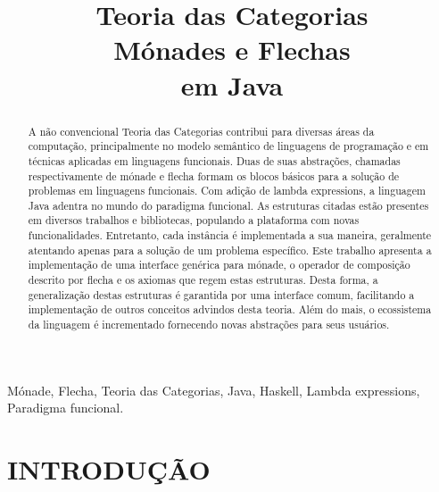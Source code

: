 \documentclass[10pt, conference]{IEEEtran}
\begin{document}

\title { 
	Teoria das Categorias \\
	Mónades e Flechas \\
	em Java 
}

\author{

}
					  
\maketitle

\begin{abstract}
A não convencional Teoria das Categorias contribui para diversas áreas da computação, principalmente no modelo semântico de linguagens de programação e em técnicas aplicadas em linguagens funcionais. Duas de suas abstrações, chamadas respectivamente de mónade e flecha formam os blocos básicos para a solução de problemas em linguagens funcionais. Com adição de lambda expressions, a linguagem Java adentra no mundo do paradigma funcional. As estruturas citadas estão presentes em diversos trabalhos e bibliotecas, populando a plataforma com novas funcionalidades. Entretanto, cada instância é implementada a sua maneira, geralmente atentando apenas para a solução de um problema específico. Este trabalho apresenta a implementação de uma interface genérica para mónade, o operador de composição descrito por flecha e os axiomas que regem estas estruturas. Desta forma, a generalização destas estruturas é garantida por uma interface comum, facilitando a implementação de outros conceitos advindos desta teoria. Além do mais, o ecossistema da linguagem é incrementado fornecendo novas abstrações para seus usuários.\\
\end{abstract}

\begin{IEEEkeywords}
Mónade, Flecha, Teoria das Categorias, Java, Haskell, Lambda expressions, Paradigma funcional.
\end{IEEEkeywords}

\section{INTRODUÇÃO}
\label{sec:intro}
\end{document}
